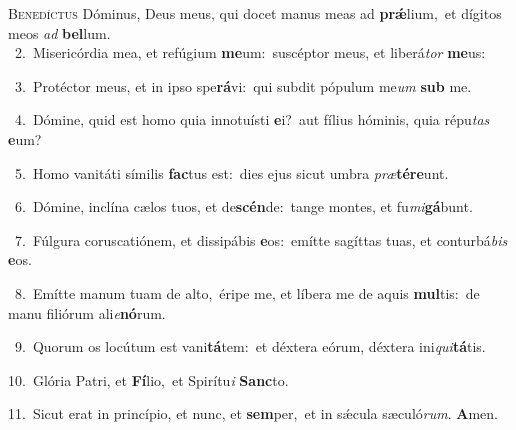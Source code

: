 \lettrine{\initial\textcolor{\initialcolor}{B}}{enedíctus} Dóminus, Deus meus, qui docet manus meas ad \textbf{prǽ}\-lium,~\star et dígitos meos \textit{ad} \textbf{bel}\-lum.\\
{\numbfont\textcolor{\numbcolor}{~2.}}~Misericórdia mea, et refúgium \textbf{me}\-um:~\star suscéptor meus, et liberá\textit{tor} \textbf{me}\-us:\par
{\numbfont\textcolor{\numbcolor}{~3.}}~Protéctor meus, et in ipso spe\-\textbf{rá}\-vi:~\star qui subdit pópulum me\textit{um} \textbf{sub} me.\par
{\numbfont\textcolor{\numbcolor}{~4.}}~Dómine, quid est homo quia innotuísti \textbf{e}\-i?~\star aut fílius hóminis, quia répu\textit{tas} \textbf{e}\-um?\par
{\numbfont\textcolor{\numbcolor}{~5.}}~Homo vanitáti símilis \textbf{fac}\-tus est:~\star dies ejus sicut umbra \textit{præ}\-\textbf{tér}\textbf{e}unt.\par
{\numbfont\textcolor{\numbcolor}{~6.}}~Dómine, inclína cælos tuos, et de\-\textbf{scén}\-de:~\star tange montes, et fu\-\textit{mi}\-\textbf{gá}bunt.\par
{\numbfont\textcolor{\numbcolor}{~7.}}~Fúlgura coruscatiónem, et dissipábis \textbf{e}\-os:~\star emítte sagíttas tuas, et conturbá\textit{bis} \textbf{e}\-os.\par
{\numbfont\textcolor{\numbcolor}{~8.}}~Emítte manum tuam de alto,~\dagger éripe me, et líbera me de aquis \textbf{mul}\-tis:~\star de manu filiórum ali\-\textit{e}\-\textbf{nó}rum.\par
{\numbfont\textcolor{\numbcolor}{~9.}}~Quorum os locútum est vani\-\textbf{tá}\-tem:~\star et déxtera eórum, déxtera ini\-\textit{qui}\-\textbf{tá}tis.\par
{\numbfont\textcolor{\numbcolor}{10.}}~Glória Patri, et \textbf{Fí}\-lio,~\star et Spirítu\textit{i} \textbf{Sanc}\-to.\par
{\numbfont\textcolor{\numbcolor}{11.}}~Sicut erat in princípio, et nunc, et \textbf{sem}\-per,~\star et in sǽcula sæculó\-\textit{rum}\-. \textbf{A}\-men.\par
